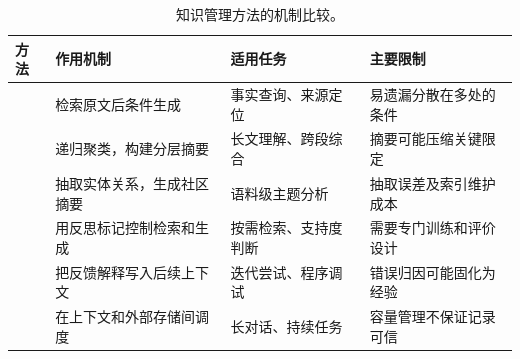 \begin{table}[t]\centering\tabletext
\caption{知识管理方法的机制比较。}
\label{tab:knowledge}
\begin{tabularx}{\textwidth}{@{}L{25mm}L{46mm}L{35mm}Y@{}}\toprule
\textbf{方法} & \textbf{作用机制} & \textbf{适用任务} & \textbf{主要限制}\\\midrule
{}
 & 检索原文后条件生成 & 事实查询、来源定位 & 易遗漏分散在多处的条件\\[3pt]
 & 递归聚类，构建分层摘要 & 长文理解、跨段综合 & 摘要可能压缩关键限定\\[3pt]
 & 抽取实体关系，生成社区摘要 & 语料级主题分析 & 抽取误差及索引维护成本\\[3pt]
 & 用反思标记控制检索和生成 & 按需检索、支持度判断 & 需要专门训练和评价设计\\
 & 把反馈解释写入后续上下文 & 迭代尝试、程序调试 & 错误归因可能固化为经验\\[3pt]
 & 在上下文和外部存储间调度 & 长对话、持续任务 & 容量管理不保证记录可信\\\bottomrule
\end{tabularx}\end{table}
